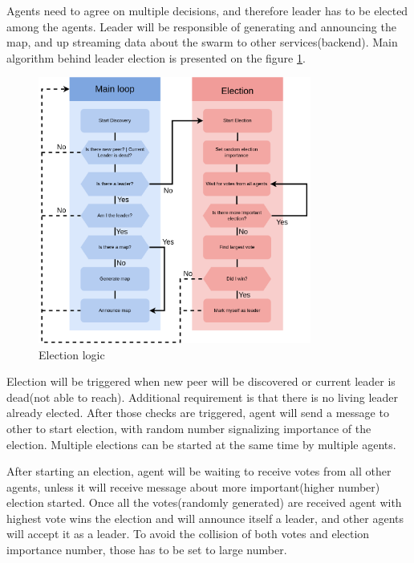Agents need to agree on multiple decisions, and therefore leader has to be elected among the agents. Leader will be responsible of generating and announcing the map, and up streaming data about the swarm to other services(backend). Main algorithm behind leader election is presented on the figure \ref{fig:election_logic}. 

\begin{figure}[H]
    \centering
    \includegraphics[width=0.8\textwidth]{pictures/election_logic.png}
    \caption{ Election logic}
    \label{fig:election_logic}
\end{figure}

Election will be triggered when new peer will be discovered or current leader is dead(not able to reach). Additional requirement is that there is no living leader already elected. After those checks are triggered, agent will send a message to other to start election, with random number signalizing importance of the election. Multiple elections can be started at the same time by multiple agents.

After starting an election, agent will be waiting to receive votes from all other agents, unless it will receive message about more important(higher number) election started. Once all the votes(randomly generated) are received agent with highest vote wins the election and will announce itself a leader, and other agents will accept it as a leader. To avoid the collision of both votes and  election importance number, those has to be set to large number.